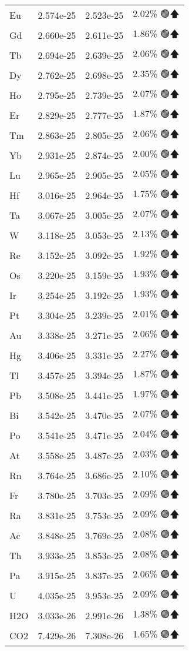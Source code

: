 \begin{longtable}{|l|c|c|c|}
Eu & 2.574e-25 & 2.523e-25 & 2.02\% 🟢🡅 \\
Gd & 2.660e-25 & 2.611e-25 & 1.86\% 🟢🡅 \\
Tb & 2.694e-25 & 2.639e-25 & 2.06\% 🟢🡅 \\
Dy & 2.762e-25 & 2.698e-25 & 2.35\% 🟢🡅 \\
Ho & 2.795e-25 & 2.739e-25 & 2.07\% 🟢🡅 \\
Er & 2.829e-25 & 2.777e-25 & 1.87\% 🟢🡅 \\
Tm & 2.863e-25 & 2.805e-25 & 2.06\% 🟢🡅 \\
Yb & 2.931e-25 & 2.874e-25 & 2.00\% 🟢🡅 \\
Lu & 2.965e-25 & 2.905e-25 & 2.05\% 🟢🡅 \\
Hf & 3.016e-25 & 2.964e-25 & 1.75\% 🟢🡅 \\
Ta & 3.067e-25 & 3.005e-25 & 2.07\% 🟢🡅 \\
W & 3.118e-25 & 3.053e-25 & 2.13\% 🟢🡅 \\
Re & 3.152e-25 & 3.092e-25 & 1.92\% 🟢🡅 \\
Os & 3.220e-25 & 3.159e-25 & 1.93\% 🟢🡅 \\
Ir & 3.254e-25 & 3.192e-25 & 1.93\% 🟢🡅 \\
Pt & 3.304e-25 & 3.239e-25 & 2.01\% 🟢🡅 \\
Au & 3.338e-25 & 3.271e-25 & 2.06\% 🟢🡅 \\
Hg & 3.406e-25 & 3.331e-25 & 2.27\% 🟢🡅 \\
Tl & 3.457e-25 & 3.394e-25 & 1.87\% 🟢🡅 \\
Pb & 3.508e-25 & 3.441e-25 & 1.97\% 🟢🡅 \\
Bi & 3.542e-25 & 3.470e-25 & 2.07\% 🟢🡅 \\
Po & 3.541e-25 & 3.471e-25 & 2.04\% 🟢🡅 \\
At & 3.558e-25 & 3.487e-25 & 2.03\% 🟢🡅 \\
Rn & 3.764e-25 & 3.686e-25 & 2.10\% 🟢🡅 \\
Fr & 3.780e-25 & 3.703e-25 & 2.09\% 🟢🡅 \\
Ra & 3.831e-25 & 3.753e-25 & 2.09\% 🟢🡅 \\
Ac & 3.848e-25 & 3.769e-25 & 2.08\% 🟢🡅 \\
Th & 3.933e-25 & 3.853e-25 & 2.08\% 🟢🡅 \\
Pa & 3.915e-25 & 3.837e-25 & 2.06\% 🟢🡅 \\
U & 4.035e-25 & 3.953e-25 & 2.09\% 🟢🡅 \\
H2O & 3.033e-26 & 2.991e-26 & 1.38\% 🟢🡅 \\
CO2 & 7.429e-26 & 7.308e-26 & 1.65\% 🟢🡅 \\

\end{longtable}

